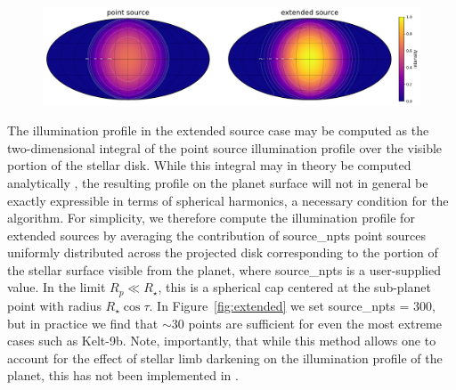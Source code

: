 \documentclass[modern]{aastex62}
\begin{document}
\begin{figure}[t!]
    \begin{centering}
        \includegraphics[width=\linewidth]{figures/extended.pdf}
    \end{centering}
\end{figure}

The illumination profile in the extended source case may be computed as the
two-dimensional integral of the point source illumination profile over
the visible portion of the stellar disk. While this integral may in theory be
computed analytically
\citep[see, for instance,][who derived series solutions to this problem]{Kopal1954},
the resulting profile on the planet surface
will not in general be exactly expressible in terms of spherical harmonics, a
necessary condition for the \starry algorithm.
For simplicity, we therefore compute the illumination profile for
extended sources by averaging the contribution of \textsf{source\_npts} point
sources uniformly distributed across the projected disk corresponding to
the portion of the stellar surface
visible from the planet, where \textsf{source\_npts} is a user-supplied
value. In the limit $R_p \ll R_\star$, this is a spherical cap centered at
the sub-planet point with radius $R_\star \cos\tau$. In
Figure~\ref{fig:extended} we set
\textsf{source\_npts} = 300, but in practice we find that ${\sim}30$
points are sufficient for even the most extreme cases such as Kelt-9b.
%
Note, importantly, that while this method allows one to account for the
effect of stellar limb darkening on the illumination profile of the planet,
this has not been implemented in \starry.
\end{document}
